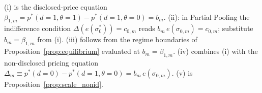 (i) is the disclosed-price equation $\beta_{1,m}=p^*(d=1,\theta=1)-p^*(d=1,\theta=0)=b_m$.
(ii): in Partial Pooling the indifference condition
$\Delta(e(\sigma_0^*))=c_{0,m}$ reads $b_m\,e(\sigma_{0,m})=c_{0,m}$; substitute $b_m=\beta_{1,m}$
from (i). (iii) follows from the regime boundaries of Proposition~\ref{prop:equilibrium}
evaluated at $b_m=\beta_{1,m}$. (iv) combines (i) with the non-disclosed pricing equation
$\Delta_m\equiv p^*(d=0)-p^*(d=1,\theta=0)=b_m\,e(\sigma_{0,m})$. (v) is
Proposition~\ref{prop:scale_nonid}.
